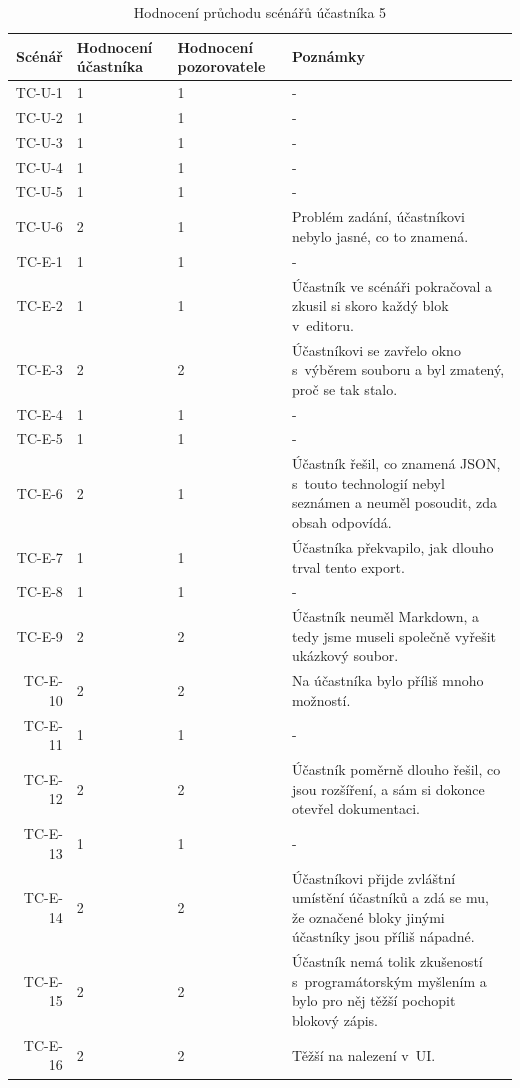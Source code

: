 \begin{longtable}{r|p{2cm}|p{2cm}|p{6cm}}
    \caption{Hodnocení průchodu scénářů účastníka 5}\label{tab:hodnoceniPruchoduUcastnika5}\\
Scénář & Hodnocení účastníka & Hodnocení pozorovatele & Poznámky\\\hline\hline
TC-U-1   & 1 & 1 & - \\\hline
TC-U-2   & 1 & 1 & - \\\hline
TC-U-3   & 1 & 1 & - \\\hline
TC-U-4   & 1 & 1 & - \\\hline
TC-U-5   & 1 & 1 & - \\\hline
TC-U-6   & 2 & 1 & Problém zadání, účastníkovi nebylo jasné, co to znamená. \\\hline
TC-E-1   & 1 & 1 & - \\\hline
TC-E-2   & 1 & 1 & Účastník ve scénáři pokračoval a zkusil si skoro každý blok v~editoru. \\\hline
TC-E-3   & 2 & 2 & Účastníkovi se zavřelo okno s~výběrem souboru a byl zmatený, proč se tak stalo. \\\hline
TC-E-4   & 1 & 1 & - \\\hline
TC-E-5   & 1 & 1 & - \\\hline
TC-E-6   & 2 & 1 & Účastník řešil, co znamená JSON, s~touto technologií nebyl seznámen a neuměl posoudit, zda obsah odpovídá. \\\hline
TC-E-7   & 1 & 1 & Účastníka překvapilo, jak dlouho trval tento export. \\\hline
TC-E-8   & 1 & 1 & - \\\hline
TC-E-9   & 2 & 2 & Účastník neuměl Markdown, a tedy jsme museli společně vyřešit ukázkový soubor. \\\hline
TC-E-10  & 2 & 2 & Na účastníka bylo příliš mnoho možností. \\\hline
TC-E-11  & 1 & 1 & - \\\hline
TC-E-12  & 2 & 2 & Účastník poměrně dlouho řešil, co jsou rozšíření, a sám si dokonce otevřel dokumentaci. \\\hline
TC-E-13  & 1 & 1 & - \\\hline
TC-E-14  & 2 & 2 & Účastníkovi přijde zvláštní umístění účastníků a zdá se mu, že označené bloky jinými účastníky jsou příliš nápadné. \\\hline
TC-E-15  & 2 & 2 & Účastník nemá tolik zkušeností s~programátorským myšlením a bylo pro něj těžší pochopit blokový zápis. \\\hline
TC-E-16  & 2 & 2 & Těžší na nalezení v~UI. \\\hline

\end{longtable}
